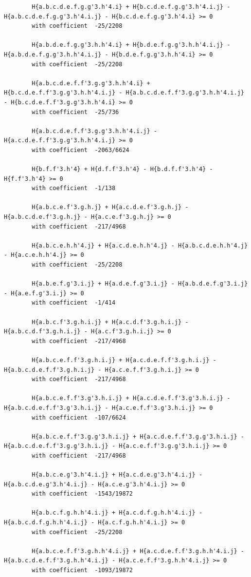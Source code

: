 \documentclass[11pt, a4paper]{kybernetika}
\begin{document}
\begin{verbatim}
		H{a.b.c.d.e.f.g.g'3.h'4.i} + H{b.c.d.e.f.g.g'3.h'4.i.j} - H{a.b.c.d.e.f.g.g'3.h'4.i.j} - H{b.c.d.e.f.g.g'3.h'4.i} >= 0
		with coefficient  -25/2208
		
		H{a.b.d.e.f.g.g'3.h.h'4.i} + H{b.d.e.f.g.g'3.h.h'4.i.j} - H{a.b.d.e.f.g.g'3.h.h'4.i.j} - H{b.d.e.f.g.g'3.h.h'4.i} >= 0
		with coefficient  -25/2208
		
		H{a.b.c.d.e.f.f'3.g.g'3.h.h'4.i} + H{b.c.d.e.f.f'3.g.g'3.h.h'4.i.j} - H{a.b.c.d.e.f.f'3.g.g'3.h.h'4.i.j} - H{b.c.d.e.f.f'3.g.g'3.h.h'4.i} >= 0
		with coefficient  -25/736
		
		H{a.b.c.d.e.f.f'3.g.g'3.h.h'4.i.j} - H{a.c.d.e.f.f'3.g.g'3.h.h'4.i.j} >= 0
		with coefficient  -2063/6624
		
		H{b.f.f'3.h'4} + H{d.f.f'3.h'4} - H{b.d.f.f'3.h'4} - H{f.f'3.h'4} >= 0
		with coefficient  -1/138
		
		H{a.b.c.e.f'3.g.h.j} + H{a.c.d.e.f'3.g.h.j} - H{a.b.c.d.e.f'3.g.h.j} - H{a.c.e.f'3.g.h.j} >= 0
		with coefficient  -217/4968
		
		H{a.b.c.e.h.h'4.j} + H{a.c.d.e.h.h'4.j} - H{a.b.c.d.e.h.h'4.j} - H{a.c.e.h.h'4.j} >= 0
		with coefficient  -25/2208
		
		H{a.b.e.f.g'3.i.j} + H{a.d.e.f.g'3.i.j} - H{a.b.d.e.f.g'3.i.j} - H{a.e.f.g'3.i.j} >= 0
		with coefficient  -1/414
		
		H{a.b.c.f'3.g.h.i.j} + H{a.c.d.f'3.g.h.i.j} - H{a.b.c.d.f'3.g.h.i.j} - H{a.c.f'3.g.h.i.j} >= 0
		with coefficient  -217/4968
		
		H{a.b.c.e.f.f'3.g.h.i.j} + H{a.c.d.e.f.f'3.g.h.i.j} - H{a.b.c.d.e.f.f'3.g.h.i.j} - H{a.c.e.f.f'3.g.h.i.j} >= 0
		with coefficient  -217/4968
		
		H{a.b.c.e.f.f'3.g'3.h.i.j} + H{a.c.d.e.f.f'3.g'3.h.i.j} - H{a.b.c.d.e.f.f'3.g'3.h.i.j} - H{a.c.e.f.f'3.g'3.h.i.j} >= 0
		with coefficient  -107/6624
		
		H{a.b.c.e.f.f'3.g.g'3.h.i.j} + H{a.c.d.e.f.f'3.g.g'3.h.i.j} - H{a.b.c.d.e.f.f'3.g.g'3.h.i.j} - H{a.c.e.f.f'3.g.g'3.h.i.j} >= 0
		with coefficient  -217/4968
		
		H{a.b.c.e.g'3.h'4.i.j} + H{a.c.d.e.g'3.h'4.i.j} - H{a.b.c.d.e.g'3.h'4.i.j} - H{a.c.e.g'3.h'4.i.j} >= 0
		with coefficient  -1543/19872
		
		H{a.b.c.f.g.h.h'4.i.j} + H{a.c.d.f.g.h.h'4.i.j} - H{a.b.c.d.f.g.h.h'4.i.j} - H{a.c.f.g.h.h'4.i.j} >= 0
		with coefficient  -25/2208
		
		H{a.b.c.e.f.f'3.g.h.h'4.i.j} + H{a.c.d.e.f.f'3.g.h.h'4.i.j} - H{a.b.c.d.e.f.f'3.g.h.h'4.i.j} - H{a.c.e.f.f'3.g.h.h'4.i.j} >= 0
		with coefficient  -1093/19872
		

\end{verbatim}
\end{document}
